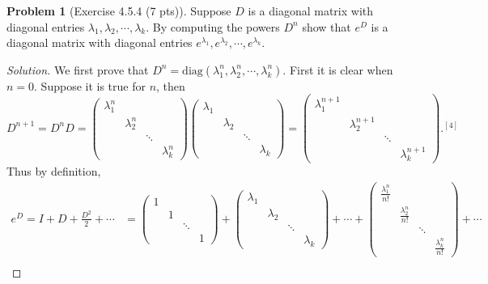 \documentclass{article}
\theoremstyle{definition}
\newtheorem{problem}{Problem}
\theoremstyle{plain}
\begin{document}
\begin{problem}[Exercise 4.5.4 (7 pts)]Suppose $D$ is a diagonal matrix with diagonal entries $\lambda_1,\lambda_2,\cdots,\lambda_k$. By computing the powers $D^n$ show that $e^D$ is a diagonal matrix with diagonal entries $e^{\lambda_1},e^{\lambda_2},\cdots,e^{\lambda_k}$.
\end{problem}
\begin{adjustwidth}{0.7cm}{}
\color{blue}
\begin{proof}[Solution]We first prove that $D^n=\mathrm{diag}(\lambda_1^n,\lambda_2^n,\cdots,\lambda_k^n)$. First it is clear when $n=0$. Suppose it is true for $n$, then
\begin{displaymath}
D^{n+1}=D^nD=\begin{pmatrix}\lambda_1^n&&&\\ &\lambda_2^n&&\\ &&\ddots&\\ &&&\lambda_k^n\end{pmatrix}\begin{pmatrix}\lambda_1&&&\\ &\lambda_2&&\\ &&\ddots&\\ &&&\lambda_k\end{pmatrix}=\begin{pmatrix}\lambda_1^{n+1}&&&\\ &\lambda_2^{n+1}&&\\ &&\ddots&\\ &&&\lambda_k^{n+1}\end{pmatrix}.^{[4]}
\end{displaymath}
Thus by definition,
\begin{align*}
e^D=I+D+\frac{D^2}{2}+\cdots&=\begin{pmatrix}1&&&\\ &1&&\\ &&\ddots&\\ &&&1\end{pmatrix}+\begin{pmatrix}\lambda_1&&&\\ &\lambda_2&&\\ &&\ddots&\\ &&&\lambda_k\end{pmatrix}+\cdots+\begin{pmatrix}\frac{\lambda_1^n}{n!}&&&\\ &\frac{\lambda_2^n}{n!}&&\\ &&\ddots&\\ &&&\frac{\lambda_k^n}{n!}\end{pmatrix}+\cdots\\

\end{align*}
\end{proof}
\end{adjustwidth}
\end{document}
